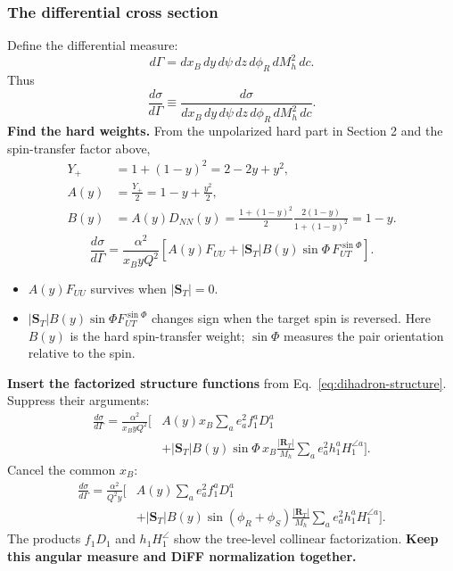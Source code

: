 \documentclass[14pt,a4paper]{extarticle}
\numberwithin{equation}{section}
\begin{document}
\subsubsection{The differential cross section}
Define the differential measure:
\begin{equation}
 d\Gamma=dx_B\,dy\,d\psi\,dz\,d\phi_R\,dM_h^2\,dc.
\end{equation}
Thus
\begin{equation}
 \frac{d\sigma}{d\Gamma}
 \equiv
 \frac{d\sigma}
 {dx_B\,dy\,d\psi\,dz\,d\phi_R\,dM_h^2\,dc}.
\end{equation}
\textbf{Find the hard weights.} From the unpolarized hard part in
Section 2 and the spin-transfer factor above,
\begin{align}
 Y_+&=1+(1-y)^2=2-2y+y^2,\\
 A(y)&=\frac{Y_+}{2}=1-y+\frac{y^2}{2},\\
 B(y)&=A(y)D_{NN}(y)
 =\frac{1+(1-y)^2}{2}
   \frac{2(1-y)}{1+(1-y)^2}
 =1-y.
\end{align}
\begin{equation}
 \boxed{\frac{d\sigma}{d\Gamma}
 =\frac{\alpha^2}{x_ByQ^2}
 \left[A(y)F_{UU}
 +|\bm S_T|B(y)\sin\Phi\,F_{UT}^{\sin\Phi}\right].}
 \label{eq:dihadron-cross-section}
\end{equation}
\begin{itemize}
 \item $A(y)F_{UU}$ survives when $|\bm S_T|=0$.
 \item $|\bm S_T|B(y)\sin\Phi F_{UT}^{\sin\Phi}$ changes sign when
 the target spin is reversed. Here $B(y)$ is the hard spin-transfer
 weight; $\sin\Phi$ measures the pair orientation relative to the spin.
\end{itemize}
\textbf{Insert the factorized structure functions}
from Eq.~\eqref{eq:dihadron-structure}. Suppress their arguments:
\begin{equation}
 \begin{aligned}
 \frac{d\sigma}{d\Gamma}
 =\frac{\alpha^2}{x_ByQ^2}\Bigg[
 &A(y)x_B\sum_a e_a^2f_1^aD_1^a\\
 &+|\bm S_T|B(y)\sin\Phi\,
   x_B\frac{|\bm R_T|}{M_h}
   \sum_a e_a^2h_1^aH_1^{\angle a}
 \Bigg].
 \end{aligned}
\end{equation}
Cancel the common $x_B$:
\begin{equation}
 \boxed{\begin{aligned}
 \frac{d\sigma}{d\Gamma}=\frac{\alpha^2}{Q^2y}
 \Bigg[&A(y)\sum_a e_a^2 f_1^aD_1^a\\
 &+|\bm S_T|B(y)\sin(\phi_R+\phi_S)
 \frac{|\bm R_T|}{M_h}\sum_a e_a^2h_1^aH_1^{\angle a}\Bigg].
 \end{aligned}}
\end{equation}
The products $f_1D_1$ and $h_1H_1^{\angle}$ show the
tree-level collinear factorization.
\textbf{Keep this angular measure and DiFF normalization together.}
\end{document}
